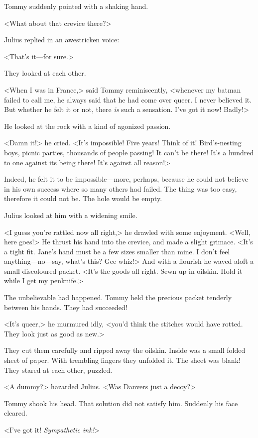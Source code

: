 Tommy suddenly pointed with a shaking hand.

<What about that crevice there?>

Julius replied in an awestricken voice:

<That's it—for sure.>

They looked at each other.

<When I was in France,> said Tommy reminiscently, <whenever my batman failed to call me, he always said that he had come over queer. I never believed it. But whether he felt it or not, there \emph{is} such a sensation. I've got it now! Badly!>

He looked at the rock with a kind of agonized passion.

<Damn it!> he cried. <It's impossible! Five years! Think of it! Bird's-nesting boys, picnic parties, thousands of people passing! It can't be there! It's a hundred to one against its being there! It's against all reason!>

Indeed, he felt it to be impossible—more, perhaps, because he could not believe in his own success where so many others had failed. The thing was too easy, therefore it could not be. The hole would be empty.

Julius looked at him with a widening smile.

<I guess you're rattled now all right,> he drawled with some enjoyment. <Well, here goes!> He thrust his hand into the crevice, and made a slight grimace. <It's a tight fit. Jane's hand must be a few sizes smaller than mine. I don't feel anything—no—say, what's this? Gee whiz!> And with a flourish he waved aloft a small discoloured packet. <It's the goods all right. Sewn up in oilskin. Hold it while I get my penknife.>

The unbelievable had happened. Tommy held the precious packet tenderly between his hands. They had succeeded!

<It's queer,> he murmured idly, <you'd think the stitches would have rotted. They look just as good as new.>

They cut them carefully and ripped away the oilskin. Inside was a small folded sheet of paper. With trembling fingers they unfolded it. The sheet was blank! They stared at each other, puzzled.

<A dummy?> hazarded Julius. <Was Danvers just a decoy?>

Tommy shook his head. That solution did not satisfy him. Suddenly his face cleared.

<I've got it! \emph{Sympathetic ink!}>


